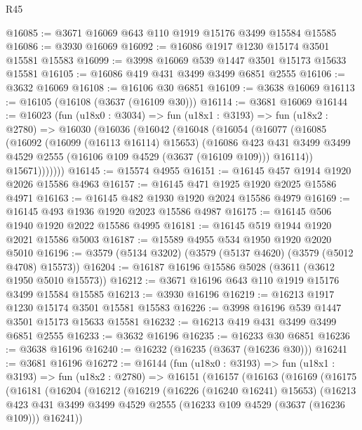 \begin{lexlean}{R45}
\begin{coremodule}
@16085 := @3671 @16069 @643 @110 @1919 @15176 @3499 @15584 @15585
@16086 := @3930 @16069
@16092 := @16086 @1917 @1230 @15174 @3501 @15581 @15583
@16099 := @3998 @16069 @539 @1447 @3501 @15173 @15633 @15581
@16105 := @16086 @419 @431 @3499 @3499 @6851 @2555
@16106 := @3632 @16069
@16108 := @16106 @30 @6851
@16109 := @3638 @16069
@16113 := @16105 (@16108 (@3637 (@16109 @30)))
@16114 := @3681 @16069
@16144 := @16023
    (fun (u18x0 : @3034) =>
    fun (u18x1 : @3193) =>
    fun (u18x2 : @2780) =>
    @16030
      (@16036
        (@16042
          (@16048
            (@16054
              (@16077
                (@16085
                  (@16092
                    (@16099 (@16113 @16114) @15653)
                    (@16086
                      @423
                      @431
                      @3499
                      @3499
                      @4529
                      @2555
                      (@16106 @109 @4529 (@3637 (@16109 @109)))
                      @16114))
                  @15671)))))))
@16145 := @15574 @4955
@16151 := @16145 @457 @1914 @1920 @2026 @15586 @4963
@16157 := @16145 @471 @1925 @1920 @2025 @15586 @4971
@16163 := @16145 @482 @1930 @1920 @2024 @15586 @4979
@16169 := @16145 @493 @1936 @1920 @2023 @15586 @4987
@16175 := @16145 @506 @1940 @1920 @2022 @15586 @4995
@16181 := @16145 @519 @1944 @1920 @2021 @15586 @5003
@16187 := @15589 @4955 @534 @1950 @1920 @2020 @5010
@16196 := @3579 (@5134 @3202) (@3579 (@5137 @4620) (@3579 (@5012 @4708) @15573))
@16204 := @16187 @16196 @15586 @5028 (@3611 (@3612 @1950 @5010 @15573))
@16212 := @3671 @16196 @643 @110 @1919 @15176 @3499 @15584 @15585
@16213 := @3930 @16196
@16219 := @16213 @1917 @1230 @15174 @3501 @15581 @15583
@16226 := @3998 @16196 @539 @1447 @3501 @15173 @15633 @15581
@16232 := @16213 @419 @431 @3499 @3499 @6851 @2555
@16233 := @3632 @16196
@16235 := @16233 @30 @6851
@16236 := @3638 @16196
@16240 := @16232 (@16235 (@3637 (@16236 @30)))
@16241 := @3681 @16196
@16272 := @16144
    (fun (u18x0 : @3193) =>
    fun (u18x1 : @3193) =>
    fun (u18x2 : @2780) =>
    @16151
      (@16157
        (@16163
          (@16169
            (@16175
              (@16181
                (@16204
                  (@16212
                    (@16219
                      (@16226 (@16240 @16241) @15653)
                      (@16213
                        @423
                        @431
                        @3499
                        @3499
                        @4529
                        @2555
                        (@16233 @109 @4529 (@3637 (@16236 @109)))
                        @16241))

\end{coremodule}
\end{lexlean}
